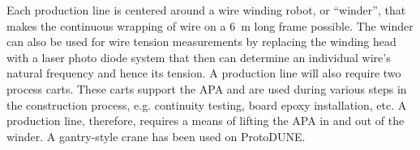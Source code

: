 Each production line is centered around a wire winding robot, or ``winder'', that makes the continuous wrapping of wire on a 6~m long frame possible. The winder can also be used for wire tension measurements by replacing the winding head with a laser photo diode system that then can determine an individual wire's natural frequency and hence its tension. A production line will also require two process carts. These carts support the APA and are used during various steps in the construction process, e.g. continuity testing, board epoxy installation, etc. A production line, therefore, requires a means of lifting the APA in and out of the winder. A gantry-style crane has been used on ProtoDUNE.


